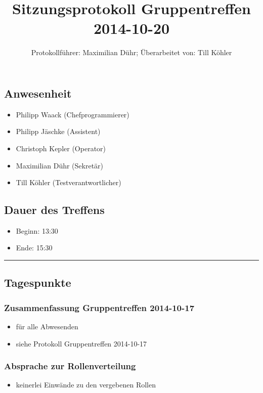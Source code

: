\documentclass[12pt,a4paper]{article}
\author{Protokollführer: Maximilian Dühr; Überarbeitet von: Till Köhler}
\title{Sitzungsprotokoll Gruppentreffen 2014-10-20}
\date{}
\begin{document}
\maketitle

\subsection*{Anwesenheit}
\medskip
\begin{itemize}
\item Philipp Waack (Chefprogrammierer)
\item Philipp Jäschke (Assistent)
\item Christoph Kepler (Operator)
\item Maximilian Dühr (Sekretär)
\item Till Köhler (Testverantwortlicher)
\end{itemize}

\subsection*{Dauer des Treffens}
\medskip
\begin{itemize}
\item Beginn: 13:30
\item Ende: 15:30
\end{itemize}

\noindent\rule{\textwidth}{1pt}

\subsection*{Tagespunkte}
\medskip

\subsubsection*{Zusammenfassung Gruppentreffen 2014-10-17}
\begin{itemize}
\item für alle Abwesenden
\item siehe Protokoll Gruppentreffen 2014-10-17
\end{itemize}

\subsubsection*{Absprache zur Rollenverteilung}
\begin{itemize}
\item keinerlei Einwände zu den vergebenen Rollen
\end{itemize}
\end{document}

